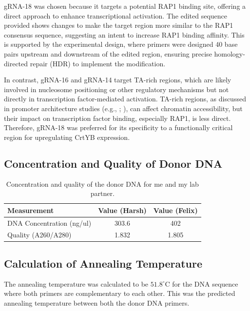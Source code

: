 \documentclass[12pt,a4paper]{article}
\begin{document}
gRNA-18 was chosen because it targets a potential RAP1 binding site, offering a
direct approach to enhance transcriptional activation. The edited sequence
provided shows changes to make the target region more similar to the RAP1
consensus sequence, suggesting an intent to increase RAP1 binding affinity.
This is supported by the experimental design, where primers were designed 40
base pairs upstream and downstream of the edited region, ensuring precise
homology-directed repair (HDR) to implement the modification.

In contrast, gRNA-16 and gRNA-14 target TA-rich regions, which are likely
involved in nucleosome positioning or other regulatory mechanisms but not
directly in transcription factor-mediated activation. TA-rich regions, as
discussed in promoter architecture studies (e.g., \citet{Gonzalez2020};
\citet{Tang2020}), can affect chromatin accessibility, but their impact on
transcription factor binding, especially RAP1, is less direct. Therefore,
gRNA-18 was preferred for its specificity to a functionally critical region for
upregulating CrtYB expression.
\subsection{Concentration and Quality of Donor DNA}
\begin{table}[h]
    \centering
    \begin{tabular}{|l|c|c|}
        \hline
        \textbf{Measurement}      & \textbf{Value (Harsh)} & \textbf{Value (Felix)} \\
        \hline
        DNA Concentration (ng/ul) & 303.6                  & 402                    \\
        \hline
        Quality (A260/A280)       & 1.832                  & 1.805                  \\
        \hline
    \end{tabular}
    \caption{\centering Concentration and quality of the donor DNA for me and my lab partner.}\label{tab:dna_concentration}
\end{table}
\subsection{Calculation of Annealing Temperature}
The annealing temperature was calculated to be $51.8^{\circ}$C for the DNA
sequence where both primers are complementary to each other. This was the
predicted annealing temperature between both the donor DNA primers.
\end{document}
